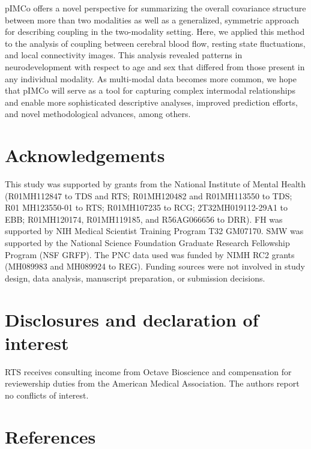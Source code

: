 \documentclass[
  12pt,
]{article}
\begin{document}
pIMCo offers a novel perspective for summarizing the overall covariance structure between more than two modalities as well as a generalized, symmetric approach for describing coupling in the two-modality setting. Here, we applied this method to the analysis of coupling between cerebral blood flow, resting state fluctuations, and local connectivity images. This analysis revealed patterns in neurodevelopment with respect to age and sex that differed from those present in any individual modality. As multi-modal data becomes more common, we hope that pIMCo will serve as a tool for capturing complex intermodal relationships and enable more sophisticated descriptive analyses, improved prediction efforts, and novel methodological advances, among others.

\hypertarget{acknowledgements}{%
\section*{Acknowledgements}\label{acknowledgements}}

This study was supported by grants from the National Institute of Mental Health (R01MH112847 to TDS and RTS; R01MH120482 and R01MH113550 to TDS; R01 MH123550-01 to RTS; R01MH107235 to RCG; 2T32MH019112-29A1 to EBB; R01MH120174, R01MH119185, and R56AG066656 to DRR). FH was supported by NIH Medical Scientist Training Program T32 GM07170. SMW was supported by the National Science Foundation Graduate Research Fellowship Program (NSF GRFP). The PNC data used was funded by NIMH RC2 grants (MH089983 and MH089924 to REG). Funding sources were not involved in study design, data analysis, manuscript preparation, or submission decisions.

\hypertarget{disclosures-and-declaration-of-interest}{%
\section*{Disclosures and declaration of interest}\label{disclosures-and-declaration-of-interest}}

RTS receives consulting income from Octave Bioscience and compensation for reviewership duties from the American Medical Association. The authors report no conflicts of interest.

\newpage

\hypertarget{references}{%
\section*{References}\label{references}}
\end{document}
